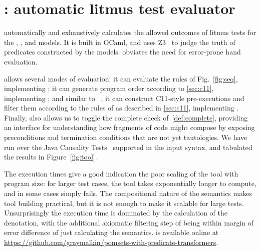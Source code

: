 \section{\PwTerTITLE: automatic litmus test evaluator}
\label{sec:tool}

\PwTer{} automatically and exhaustively calculates the allowed outcomes of litmus tests for the \PwT, \PwTpo, and \PwTc{} models. It is built in OCaml, and uses Z3~\cite{Z3Solver} to judge the truth of predicates constructed by the models. \PwTer{} obviates the need for error-prone hand evaluation.

\PwTer{} allows several modes of evaluation: it can evaluate the rules of Fig.~\ref{fig:seq}, implementing \PwT; it can generate program order according to \textsection\ref{sec:c11}, implementing \PwTpo; and similar to \MRD~\cite{DBLP:conf/esop/PaviottiCPWOB20}, it can construct C11-style pre-executions and filter them according to the rules of \rcXI{} as described in \textsection\ref{sec:c11}, implementing \PwTc{}.
Finally, \PwTer{} also allows us to toggle the complete check of~\ref{def:complete}, providing an interface for understanding how fragments of code might compose by exposing preconditions and termination conditions that are not yet tautologies.
We have run \PwTer{} over the Java Causality Tests~\cite{PughWebsite} supported in the input syntax, and tabulated the results in Figure~\ref{fig:tool}.

The execution times give a good indication the poor scaling of the tool with program size: for larger test cases, the tool takes exponentially longer to compute, and in some cases simply fails.
The compositional nature of the semantics makes tool building practical, but it is not enough to make it scalable for large tests.
Unsurprisingly the execution time is dominated by the calculation of the denotation, with the additional axiomatic filtering step of \PwTc{} being within margin of error difference of just calculating the \PwT{} semantics. 
\PwTer{} is available online at \url{https://github.com/graymalkin/pomsets-with-predicate-transformers}.


